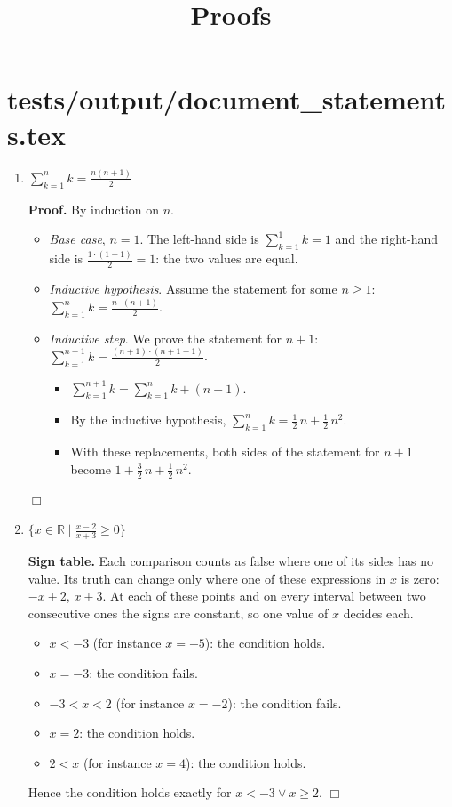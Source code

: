 \documentclass[11pt,a4paper]{article}
\title{Proofs}
\author{}
\date{}
\begin{document}
\maketitle

\section*{tests/\allowbreak{}output/\allowbreak{}document\_\allowbreak{}statements.tex}
\begin{enumerate}
\item $\displaystyle \sum_{k=1}^{n} k = \frac{n(n+1)}{2}$

\textbf{Proof.} By induction on $n$.
\begin{itemize}
\item \emph{Base case}, $n = 1$. The left-hand side is $\sum_{k=1}^{1} k = 1$ and the right-hand side is $\frac{1 \cdot \left(1 + 1\right)}{2} = 1$: the two values are equal.
\item \emph{Inductive hypothesis}. Assume the statement for some $n \ge 1$: $\sum_{k=1}^{n} k = \frac{n \cdot \left(n + 1\right)}{2}$.
\item \emph{Inductive step}. We prove the statement for $n + 1$: $\sum_{k=1}^{n + 1} k = \frac{\left(n + 1\right) \cdot \left(n + 1 + 1\right)}{2}$.
\begin{itemize}
\item $\sum_{k=1}^{n + 1} k = \sum_{k=1}^{n} k + \left(n + 1\right)$.
\item By the inductive hypothesis, $\sum_{k=1}^{n} k = \frac{1}{2}\,n + \frac{1}{2}\,n^{2}$.
\item With these replacements, both sides of the statement for $n + 1$ become $1 + \frac{3}{2}\,n + \frac{1}{2}\,n^{2}$.
\end{itemize}
\end{itemize}
$\Box$

\item $\displaystyle \{x \in \mathbb{R} \mid \frac{x - 2}{x + 3} \ge 0\}$

\textbf{Sign table.} Each comparison counts as false where one of its sides has no value. Its truth can change only where one of these expressions in $x$ is zero: $-x + 2$, $x + 3$. At each of these points and on every interval between two consecutive ones the signs are constant, so one value of $x$ decides each.
\begin{itemize}
\item $x < -3$ (for instance $x = -5$): the condition holds.
\item $x = -3$: the condition fails.
\item $-3 < x < 2$ (for instance $x = -2$): the condition fails.
\item $x = 2$: the condition holds.
\item $2 < x$ (for instance $x = 4$): the condition holds.
\end{itemize}
Hence the condition holds exactly for $x < -3 \lor x \ge 2$. $\Box$


\end{enumerate}
\end{document}
